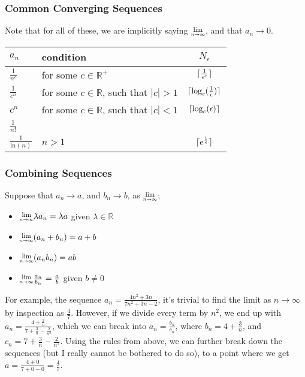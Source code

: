 \documentclass[a4paper, 12pt]{article}
\DeclarePairedDelimiter{\ceil}{\lceil}{\rceil}
\newcommand{\limit}[2]{\raisebox{0.5ex}{\scalebox{0.8}{$\displaystyle{\lim_{#1 \to #2}}$}}}
\begin{document}
            \subsubsection*{Common Converging Sequences}
                Note that for all of these, we are implicitly saying $\limit{n}{\infty}$, and that $a_n \to 0$.
                \begin{center}
                    \begin{tabular}{l|l|c}
                        $a_n$ & condition & $N_\epsilon$ \\
                        \hline
                        $\frac{1}{n^c}$ & for some $c \in \mathbb{R}^+$ & $\ceil{\frac{1}{\epsilon^c}}$ \\
                        $\frac{1}{c^n}$ & for some $c \in \mathbb{R}$, such that $|c| > 1$ & $\ceil{\text{log}_c(\frac{1}{\epsilon})}$ \\
                        $c^n$ & for some $c \in \mathbb{R}$, such that $|c| < 1$ & $\ceil{\text{log}_c(\epsilon)}$ \\
                        $\frac{1}{n!}$ & & \\
                        $\frac{1}{\text{ln}(n)}$ & $n > 1$ & $\ceil{e^{\frac{1}{\epsilon}}}$
                    \end{tabular}
                \end{center}
            \subsubsection*{Combining Sequences}
                Suppose that $a_n \to a$, and $b_n \to b$, as $\limit{n}{\infty}$;
                \begin{itemize}
                    \itemsep0em
                    \item $\limit{n}{\infty}\lambda a_n = \lambda a$ given $\lambda \in \mathbb{R}$
                    \item $\limit{n}{\infty}(a_n + b_n) = a + b$
                    \item $\limit{n}{\infty}(a_nb_n) = ab$
                    \item $\limit{n}{\infty}{\frac{a_n}{b_n}} = \frac{a}{b}$ given $b \neq 0$
                \end{itemize}
                \medskip

                For example, the sequence $a_n = \frac{4n^2 + 3n}{7n^2 + 3n - 2}$, it's trivial to find the limit as $n \to \infty$ by inspection as $\frac{4}{7}$. However, if we divide every term by $n^2$, we end up with $a_n = \frac{4 + \frac{3}{n}}{7 + \frac{3}{n} - \frac{2}{n^2}}$, which we can break into $a_n = \frac{b_n}{c_n}$, where $b_n = 4 + \frac{3}{n}$, and $c_n = 7 + \frac{3}{n} - \frac{2}{n^2}$. Using the rules from above, we can further break down the sequences (but I really cannot be bothered to do so), to a point where we get $a = \frac{4 + 0}{7 + 0 - 0} = \frac{4}{7}$.
\end{document}
